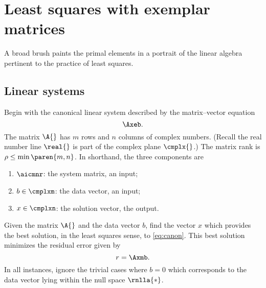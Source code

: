 \chapter[Least squares with exemplars]{Least squares with exemplar matrices}   %

A broad brush paints the primal elements in a portrait of the linear algebra pertinent to the practice of least squares.

\section{Linear systems}  %
Begin with the canonical linear system described by the matrix--vector equation
  \begin{equation}
    \Axeb .
    \label{eq:canon}
  \end{equation}
The matrix $\A{}$ has $m$ rows and $n$ columns of complex numbers. (Recall the real number line $\real{}$ is part of the complex plane $\cmplx{}$.) The matrix rank is $\rho\le\min\paren{m,n}$. In shorthand, the three components are
    \begin{enumerate}
    	\item $\aicmnr$: the system matrix, an input;
    	\item $b\in\cmplxm$: the data vector, an input;
    	\item $x\in\cmplxn$: the solution vector, the output.
    \end{enumerate}
Given the matrix $\A{}$ and the data vector $b$, find the vector $x$ which provides the best solution, in the least squares sense, to \eqref{eq:canon}. This best solution minimizes the  residual error given by
  \begin{equation}
    r = \Axmb .
  \end{equation}
In all instances, ignore the trivial cases where $b = 0$ which corresponds to the data vector lying within the null space $\rnlla{*}$.

